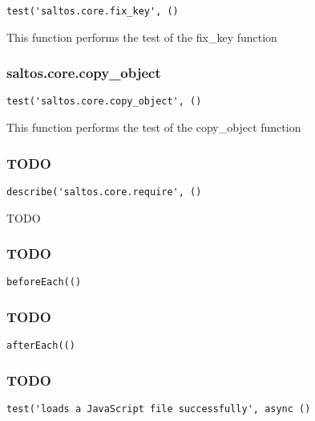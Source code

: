 \documentclass[a4paper]{article}
\begin{document}
\begin{lstlisting}
test('saltos.core.fix_key', ()
\end{lstlisting}

This function performs the test of the fix\_key function

\hypertarget{toc521}{}
\subsubsection{saltos.core.copy\_object}

\begin{lstlisting}
test('saltos.core.copy_object', ()
\end{lstlisting}

This function performs the test of the copy\_object function

\hypertarget{toc522}{}
\subsubsection{TODO}

\begin{lstlisting}
describe('saltos.core.require', ()
\end{lstlisting}

TODO

\hypertarget{toc523}{}
\subsubsection{TODO}

\begin{lstlisting}
beforeEach(()
\end{lstlisting}

\hypertarget{toc524}{}
\subsubsection{TODO}

\begin{lstlisting}
afterEach(()
\end{lstlisting}

\hypertarget{toc525}{}
\subsubsection{TODO}

\begin{lstlisting}
test('loads a JavaScript file successfully', async ()
\end{lstlisting}
\end{document}
